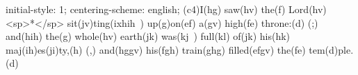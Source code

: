 initial-style: 1;
centering-scheme: english;
(c4)I(hg) saw(hv) the(f) Lord(hv) <sp>*</sp> sit(jv)ting(ixhih~) up(g)on(ef) a(gv) high(fe) throne:(d) (;) and(hih) the(g) whole(hv) earth(jk) was(kj~) full(kl) of(jk) his(hk) maj(ih)es(ji)ty,(h) (,) and(hggv) his(fgh) train(ghg) filled(efgv) the(fe) tem(d)ple.(d)

